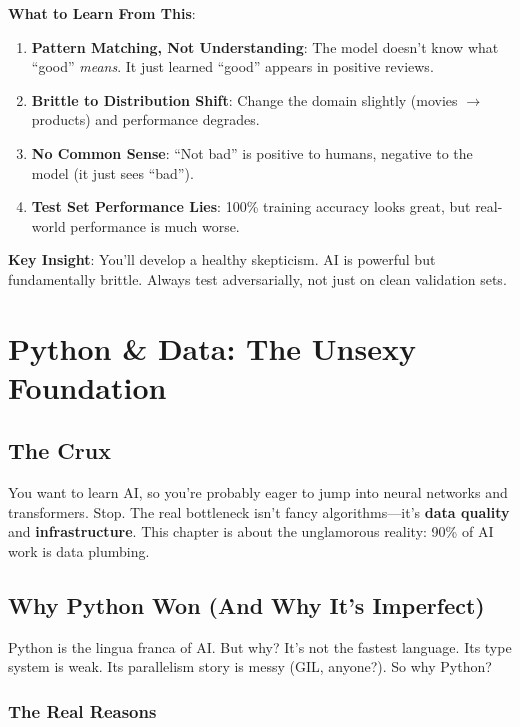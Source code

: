 \documentclass[11pt,oneside]{book}
\newcommand{\blankpage}{%
    \clearpage
    \thispagestyle{empty}
    \mbox{}
    \clearpage
}
\begin{document}
\textbf{What to Learn From This}:

\begin{enumerate}
\item \textbf{Pattern Matching, Not Understanding}: The model doesn't know what ``good'' \textit{means}. It just learned ``good'' appears in positive reviews.

\item \textbf{Brittle to Distribution Shift}: Change the domain slightly (movies \(\rightarrow\) products) and performance degrades.

\item \textbf{No Common Sense}: ``Not bad'' is positive to humans, negative to the model (it just sees ``bad'').

\item \textbf{Test Set Performance Lies}: 100\% training accuracy looks great, but real-world performance is much worse.
\end{enumerate}

\textbf{Key Insight}: You'll develop a healthy skepticism. AI is powerful but fundamentally brittle. Always test adversarially, not just on clean validation sets.

\blankpage


\chapter{Python \& Data: The Unsexy Foundation}

\section{The Crux}
You want to learn AI, so you're probably eager to jump into neural networks and transformers. Stop. The real bottleneck isn't fancy algorithms—it's \textbf{data quality} and \textbf{infrastructure}. This chapter is about the unglamorous reality: 90\% of AI work is data plumbing.

\section{Why Python Won (And Why It's Imperfect)}

Python is the lingua franca of AI. But why? It's not the fastest language. Its type system is weak. Its parallelism story is messy (GIL, anyone?). So why Python?

\subsection{The Real Reasons}
\end{document}
